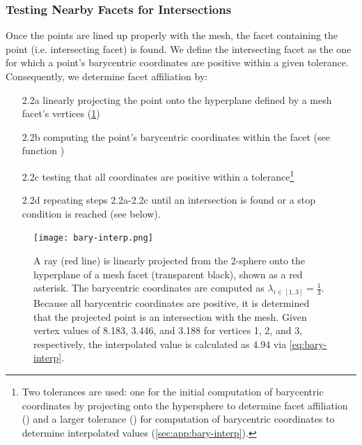 \documentclass[final,twocolumn,12pt]{elsarticle}
\begin{document}
\begin{appendices}
\subsubsection{Testing Nearby Facets for Intersections}
\label{sec:app:bary:int:facets}
Once the \outpt{} points are lined up properly with the mesh, the facet containing the \outpt{} point (i.e. intersecting facet) is found. We define the intersecting facet as the one for which a point's barycentric coordinates are positive within a given tolerance. Consequently, we determine facet affiliation by:
\begin{enumerate}
    \item[2.2a] linearly projecting the \outpt{} point onto the hyperplane defined by a mesh facet's vertices (\cref{fig:bary-interp})
    \item[2.2b] computing the point's barycentric coordinates within the facet \cite{anatoliyCheckIfRay2015,skalaRobustBarycentricCoordinates2013} (see \vfzorepo{} function )
    \item[2.2c] testing that all coordinates are positive \cite{langerSphericalBarycentricCoordinates2006} within a tolerance\footnote{Two tolerances are used: one for the initial computation of barycentric coordinates by projecting onto the hypersphere to determine facet affiliation () and a larger tolerance () for computation of barycentric coordinates to determine interpolated values (\cref{sec:app:bary-interp}). }
    \item[2.2d] repeating steps 2.2a-2.2c until an intersection is found or a stop condition is reached (see  below).
\end{enumerate}

\begin{figure}
    \centering
    \texttt{[image: bary-interp.png]}
    \caption{A ray (red line) is linearly projected from the 2-sphere onto the hyperplane of a mesh facet (transparent black), shown as a red asterisk. The barycentric coordinates are computed as $\lambda_{i \in [1,3]} = \frac{1}{3}$. Because all barycentric coordinates are positive, it is determined that the projected point is an intersection with the mesh. Given vertex values of \num{8.183}, \num{3.446}, and \num{3.188} for vertices 1, 2, and 3, respectively, the interpolated value is calculated as \num{4.94} via \cref{eq:bary-interp}.}
    \label{fig:bary-interp}
\end{figure}


\end{appendices}
\end{document}
